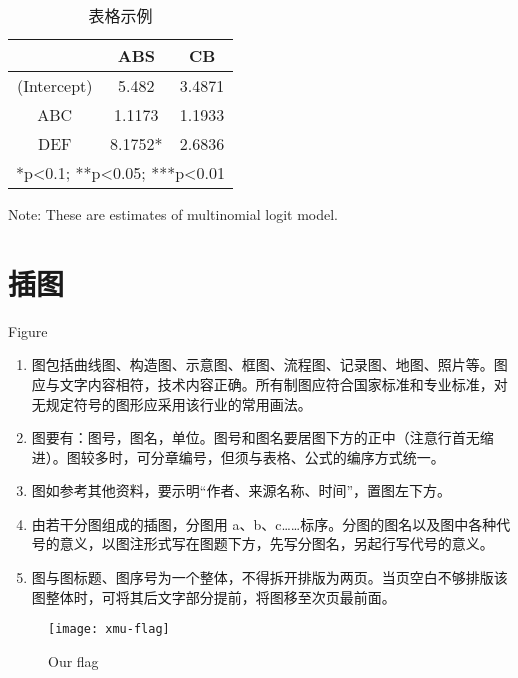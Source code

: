 \begin{table}[!ht]
			\centering
	\begin{threeparttable}[b]
		\footnotesize
		\caption{表格示例}
		\begin{tabular}{ccc}
			\toprule
			& \multicolumn{1}{c}{ABS} & \multicolumn{1}{c}{CB} \\
			\midrule
			(Intercept) & 5.482 & 3.4871 \\
			ABC & 1.1173 & 1.1933 \\
			DEF & 8.1752* & 2.6836 \\
			\bottomrule
			\multicolumn{3}{c}{*p<0.1; **p<0.05; ***p<0.01} \\
			\bottomrule
		\end{tabular}%
		\label{tab:mlogit}%
		\begin{tablenotes}
			\footnotesize
			Note: These are estimates of multinomial logit model.
		\end{tablenotes}
	\end{threeparttable}
\end{table}%



\section{插图}{Figure}

\begin{enumerate}
	\item 图包括曲线图、构造图、示意图、框图、流程图、记录图、地图、照片等。图应与文字内容相符，技术内容正确。所有制图应符合国家标准和专业标准，对无规定符号的图形应采用该行业的常用画法。
	\item 图要有：图号，图名，单位。图号和图名要居图下方的正中（注意行首无缩进）。图较多时，可分章编号，但须与表格、公式的编序方式统一。
	\item 图如参考其他资料，要示明“作者、来源名称、时间”，置图左下方。
	\item 由若干分图组成的插图，分图用 a、b、c……标序。分图的图名以及图中各种代号的意义，以图注形式写在图题下方，先写分图名，另起行写代号的意义。
	\item 图与图标题、图序号为一个整体，不得拆开排版为两页。当页空白不够排版该图整体时，可将其后文字部分提前，将图移至次页最前面。
\end{enumerate}

\begin{figure}[!ht]
\centering
\texttt{[image: xmu-flag]}
\caption{Our flag} \label{fig11}
\end{figure}

